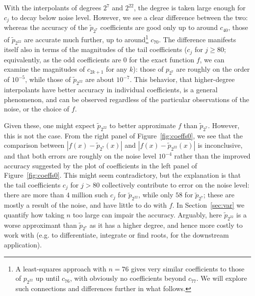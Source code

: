 \documentclass[final,onefignum,onetabnum]{siamart220329}
\begin{document}
With the interpolants of degrees $2^7$ and $2^{22}$, the degree is taken large enough for $c_j$ to decay below noise level. However, we see a clear difference between the two: whereas the accuracy of the $\tilde p_{2^7}$ coefficients are good only up to around $c_{40}$, those of $\tilde p_{2^{22}}$ are accurate much further, up to around\footnote{A least-squares approach with $n=76$ gives very similar coefficients to those of $p_{2^{22}}$ up until $c_{76}$, with obviously no coefficients beyond $c_{77}$. We will explore such connections and differences further in what follows.}
$c_{70}$. 
The difference manifests itself also in terms of the magnitudes of the tail coefficients ($c_j$ for $j\geq 80$; equivalently, as the odd coefficients are 0 for the exact function $f$, we can examine the magnitudes of $c_{2k+1}$ for any $k$): those of $p_{2^7}$ are roughly on the order of $10^{-5}$, while those of $\tilde p_{2^{22}}$ are about $10^{-7}$. 
This behavior, that higher-degree interpolants have better accuracy in individual coefficients, is a general phenomenon, and can be observed regardless of the particular observations of the noise, or the choice of $f$. 

Given these, one might expect $\tilde p_{2^{22}}$ to better approximate $f$ than $\tilde p_{2^7}$. However, this is not the case. From the right panel of Figure~\ref{fig:coeffs0}, we see that the comparison between 
$|f(x)-\tilde p_{2^7}(x)|$ and $|f(x)-\tilde p_{2^{22}}(x)|$ is inconclusive, 
and that both errors are roughly on the noise level $10^{-4}$ rather than the improved accuracy suggested by the plot of coefficients in the left panel of Figure~\ref{fig:coeffs0}. 
This might seem contradictory, but the explanation is that the tail coefficients $c_j$ for $j>80$ collectively contribute to error on the noise level: there are more than $4$ million such $c_j$ for $\tilde p_{2^{22}}$, while only $58$ for $\tilde p_{2^7}$; these are mostly a result of the noise, and have little to do with $f$. 
In Section~\ref{sec:var} we quantify how taking $n$ too large can impair the accuracy. 
Arguably, here $\tilde p_{2^{22}}$ is a worse approximant than $\tilde p_{2^{7}}$ as it has a higher degree, and hence more costly to work with (e.g. to differentiate, integrate or find roots, for the downstream application). 
\end{document}

